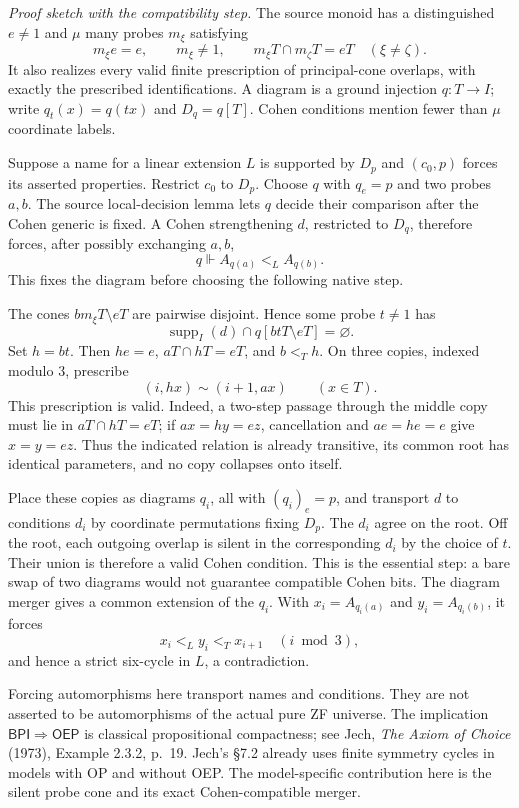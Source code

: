 \emph{Proof sketch with the compatibility step.}
The source monoid has a distinguished $e\ne1$ and $\mu$ many probes
$m_\xi$ satisfying
\[
 m_\xi e=e,\qquad m_\xi\ne1,\qquad
 m_\xi T\cap m_\zeta T=eT\quad(\xi\ne\zeta).
\]
It also realizes every valid finite prescription of principal-cone
overlaps, with exactly the prescribed identifications. A diagram is a
ground injection $q:T\to I$; write $q_t(x)=q(tx)$ and $D_q=q[T]$.
Cohen conditions mention fewer than $\mu$ coordinate labels.

Suppose a name for a linear extension $L$ is supported by $D_p$ and
$(c_0,p)$ forces its asserted properties. Restrict $c_0$ to $D_p$.
Choose $q$ with $q_e=p$ and two probes $a,b$. The source local-decision
lemma lets $q$ decide their comparison after the Cohen generic is fixed.
A Cohen strengthening $d$, restricted to $D_q$, therefore forces, after
possibly exchanging $a,b$,
\[
 q\Vdash A_{q(a)}<_L A_{q(b)}.
\]
This fixes the diagram before choosing the following native step.

The cones $bm_\xi T\setminus eT$ are pairwise disjoint. Hence some
probe $t\ne1$ has
\[
 \operatorname{supp}_I(d)\cap q[btT\setminus eT]=\varnothing.
\]
Set $h=bt$. Then $he=e$, $aT\cap hT=eT$, and $b<_T h$.
On three copies, indexed modulo $3$, prescribe
\[
                   (i,hx)\sim(i+1,ax)\qquad(x\in T).
\]
This prescription is valid. Indeed, a two-step passage through the
middle copy must lie in $aT\cap hT=eT$; if $ax=hy=ez$, cancellation
and $ae=he=e$ give $x=y=ez$. Thus the indicated relation is already
transitive, its common root has identical parameters, and no copy
collapses onto itself.

Place these copies as diagrams $q_i$, all with $(q_i)_e=p$, and transport
$d$ to conditions $d_i$ by coordinate permutations fixing $D_p$.
The $d_i$ agree on the root. Off the root, each outgoing overlap is
silent in the corresponding $d_i$ by the choice of $t$. Their union
is therefore a valid Cohen condition. This is the essential step:
a bare swap of two diagrams would not guarantee compatible Cohen bits.
The diagram merger gives a common extension of the $q_i$. With
$x_i=A_{q_i(a)}$ and $y_i=A_{q_i(b)}$, it forces
\[
 x_i<_L y_i<_T x_{i+1}\quad(i\bmod3),
\]
and hence a strict six-cycle in $L$, a contradiction.

Forcing automorphisms here transport names and conditions. They are
not asserted to be automorphisms of the actual pure ZF universe.
The implication $\mathsf{BPI}\Rightarrow\mathsf{OEP}$ is classical
propositional compactness; see Jech, \emph{The Axiom of Choice} (1973),
Example 2.3.2, p.~19. Jech's \S7.2 already uses finite symmetry cycles
in models with OP and without OEP. The model-specific contribution here
is the silent probe cone and its exact Cohen-compatible merger.

